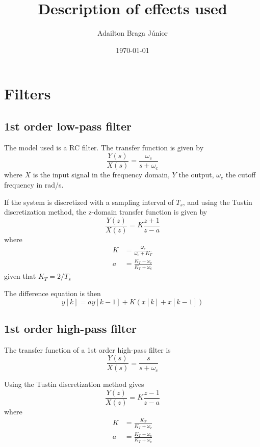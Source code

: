 \documentclass[11pt]{article}
\title{Description of effects used}
\author{Adailton Braga Júnior}
\date{\today}
\begin{document}
\maketitle


\section{Filters}
\subsection{1st order low-pass filter}

The model used is a RC filter. The transfer function is given by
\begin{equation}
	\frac{Y(s)}{X(s)} = \frac{\omega_c}{s + \omega_c}
\end{equation}
where $X$ is the input signal in the frequency domain, $Y$ the output, $\omega_c$ the cutoff frequency in rad/s.

If the system is discretized with a sampling interval of $T_s$, and using the Tustin discretization method, the z-domain transfer function is given by
\begin{equation}
	\frac{Y(z)}{X(z)} = K \frac{z+1} {z - a}
\end{equation}
where 
\begin{align}
	K &= \frac{\omega_c}{\omega_c + K_T} \\
	a &= \frac{K_T - \omega_c}{K_T + \omega_c}
\end{align}
given that $K_T = 2 / T_s$

The difference equation is then
\begin{equation}
	y[k] = ay[k-1] + K (x[k] + x[k-1])
\end{equation}


\subsection{1st order high-pass filter}

The transfer function of a 1st order high-pass filter is 
\begin{equation}
	\frac{Y(s)}{X(s)} = \frac{s}{s + \omega_c}
\end{equation}

Using the Tustin discretization method gives
\begin{equation}
	\frac{Y(z)}{X(z)} = K \frac{z - 1}{z - a}
\end{equation}
where
\begin{align}
	K &= \frac{K_T}{K_T + \omega_c} \\
	a &= \frac{K_T - \omega_c}{K_T + \omega_c}
\end{align}
\end{document}
